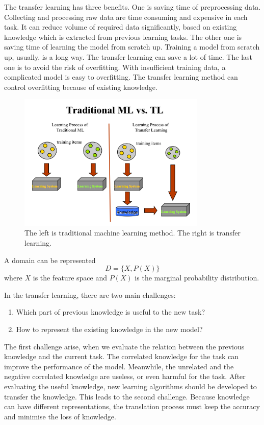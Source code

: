 The transfer learning has three benefits. One is saving time of preprocessing data. Collecting and processing raw data are time consuming and expensive in each task. It can reduce volume of required data significantly, based on existing knowledge which is extracted from previous learning tasks. The other one is saving time of learning the model from scratch up. Training a model from scratch up, usually, is a long way. The transfer learning can save a lot of time. The last one is to avoid the risk of overfitting. With insufficient training data, a complicated model is easy to overfitting. The transfer learning method can control overfitting because of existing knowledge.

\graphicspath{ {./Figures/} }
\begin{figure}[!htb]
\centering
\includegraphics[width=0.8\textwidth]{MLvsTL.png}
\caption{\label{fig:TransferLearning}The left is traditional machine learning method. The right is transfer learning.}
\end{figure}

A domain can be represented
\begin{equation}\label{eq:TransLearning}
D = \{ X, P(X) \}
\end{equation}
where $X$ is the feature space and $P(X)$ is the marginal probability distribution. 

In the transfer learning, there are two main challenges: 
\begin{enumerate}
  \item Which part of previous knowledge is useful to the new task?
  \item How to represent the existing knowledge in the new model?
\end{enumerate}
The first challenge arise, when we evaluate the relation between the previous knowledge and the current task. The correlated knowledge for the task can improve the performance of the model. Meanwhile, the unrelated and the negative correlated knowledge are useless, or even harmful for the task. After evaluating the useful knowledge, new learning algorithms should be developed to transfer the knowledge. This leads to the second challenge. Because knowledge can have different representations, the translation process must keep the accuracy and minimise the loss of knowledge. 